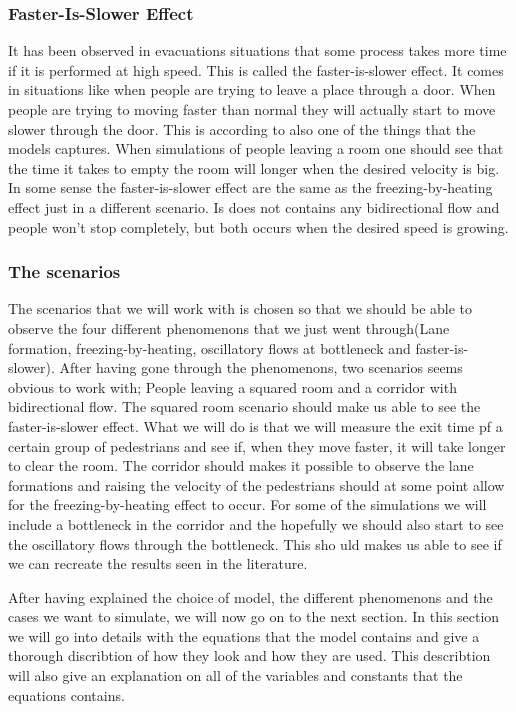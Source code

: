 \subsubsection{Faster-Is-Slower Effect}
It has been observed in evacuations situations that some process takes more 
time if it is performed at high speed. This is called the faster-is-slower effect. It comes in situations like when people are trying to leave a place through a door. When people are trying to moving faster than normal they will actually start to move slower through the door. This is according to \cite{self-org} also one of the things that the models captures. When simulations of people leaving a room one should see that the time it takes to empty the room will longer when the desired velocity is big.  In some sense the faster-is-slower effect are the same as the freezing-by-heating effect just in a different scenario. Is does not contains any bidirectional flow and people won't stop completely, but both occurs when the desired speed is growing. 

\subsubsection{The scenarios}
The scenarios that we will work with is chosen so that we should be able to observe the four different phenomenons that we just went through(Lane formation, freezing-by-heating, oscillatory flows at bottleneck and faster-is-slower). After having gone through the phenomenons, two scenarios seems obvious to work with; People leaving a squared room and a corridor with bidirectional flow. The squared room scenario should make us able to see the faster-is-slower effect. What we will do is that we will measure the exit time pf a certain group of pedestrians and see if, when they move faster, it will take longer to clear the room. The corridor should makes it possible to observe the lane formations and raising the velocity of the pedestrians should at some point allow for the freezing-by-heating effect to occur. For some of the simulations we will include a bottleneck in the corridor and the hopefully we should also start to see the oscillatory flows through the bottleneck. This sho
 uld makes us able to see if we can recreate the results seen in the literature.   


 After having explained the choice of model, the different phenomenons and the cases we want to simulate, we will now go on to the next section.  In this section we will go into details with the equations that the model contains and give a thorough discribtion of how they look and how they are used. This describtion will also give an explanation on all of the variables and constants that the equations contains.
